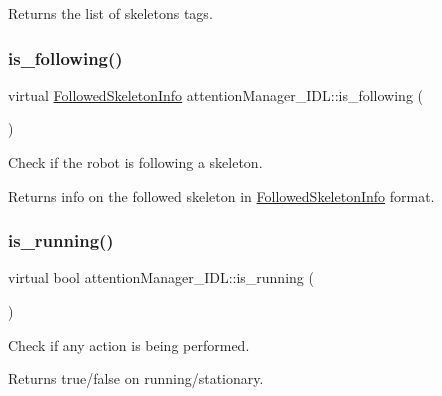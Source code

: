 \begin{DoxyReturn}{Returns}
the list of skeletons\textquotesingle{} tags. 
\end{DoxyReturn}
\mbox{\label{classattentionManager__IDL_a03b844a8bd3d6e2b4cf5ba88ace27429}} 
\subsubsection{\texorpdfstring{is\_following()}{is\_following()}}
{\footnotesize\ttfamily virtual \mbox{\hyperlink{classFollowedSkeletonInfo}{Followed\+Skeleton\+Info}} attention\+Manager\+\_\+\+I\+D\+L\+::is\+\_\+following (\begin{DoxyParamCaption}{ }\end{DoxyParamCaption})\hspace{0.3cm}{\ttfamily [virtual]}}



Check if the robot is following a skeleton. 

\begin{DoxyReturn}{Returns}
info on the followed skeleton in \mbox{\hyperlink{classFollowedSkeletonInfo}{Followed\+Skeleton\+Info}} format. 
\end{DoxyReturn}
\mbox{\label{classattentionManager__IDL_ada750e5a7c6a0bb99be495e24d34dcdd}} 
\subsubsection{\texorpdfstring{is\_running()}{is\_running()}}
{\footnotesize\ttfamily virtual bool attention\+Manager\+\_\+\+I\+D\+L\+::is\+\_\+running (\begin{DoxyParamCaption}{ }\end{DoxyParamCaption})\hspace{0.3cm}{\ttfamily [virtual]}}



Check if any action is being performed. 

\begin{DoxyReturn}{Returns}
true/false on running/stationary. 
\end{DoxyReturn}
\mbox{\label{classattentionManager__IDL_aa6b2c971be0e878ab259675c83bba2dc}} 
